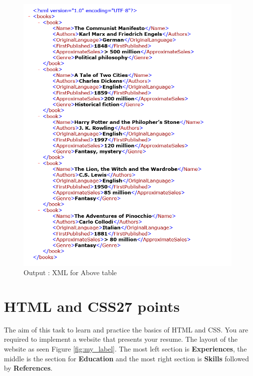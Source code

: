 \documentclass{resources/WeSTassignment}
\begin{document}
\begin{figure}[h]
   			\centering
   			\includegraphics[scale=1.0]{resources/booksXml.PNG}
   			\caption{Output : XML for Above table}
   			\label{fig: BooksXml}
\end{figure}

\section{HTML and CSS\hfill{27 points}\label{html}}
The aim of this task to learn and practice the basics of HTML and CSS. You are required to implement a website that presents your resume. The layout of the website as seen Figure \ref{fig:my_label}. The most left section is \textbf{Experiences}, the middle is the section for \textbf{Education} and the most right section is \textbf{Skills} followed by \textbf{References}.
\end{document}
